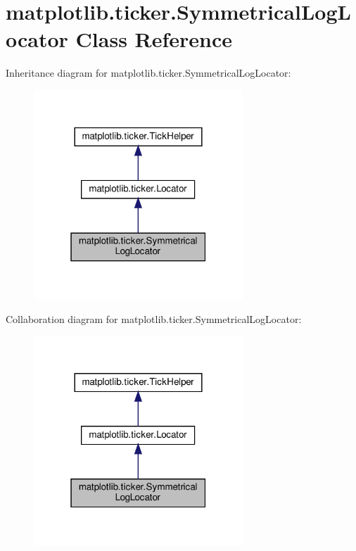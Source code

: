 \hypertarget{classmatplotlib_1_1ticker_1_1SymmetricalLogLocator}{}\section{matplotlib.\+ticker.\+Symmetrical\+Log\+Locator Class Reference}
\label{classmatplotlib_1_1ticker_1_1SymmetricalLogLocator}


Inheritance diagram for matplotlib.\+ticker.\+Symmetrical\+Log\+Locator\+:
\nopagebreak
\begin{figure}[H]
\begin{center}
\leavevmode
\includegraphics[width=223pt]{classmatplotlib_1_1ticker_1_1SymmetricalLogLocator__inherit__graph}
\end{center}
\end{figure}


Collaboration diagram for matplotlib.\+ticker.\+Symmetrical\+Log\+Locator\+:
\nopagebreak
\begin{figure}[H]
\begin{center}
\leavevmode
\includegraphics[width=223pt]{classmatplotlib_1_1ticker_1_1SymmetricalLogLocator__coll__graph}
\end{center}
\end{figure}
